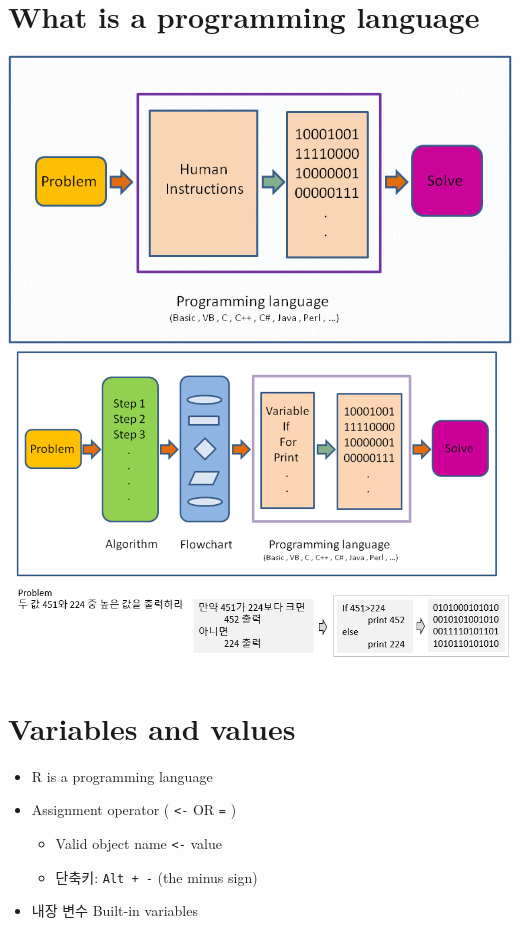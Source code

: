 \documentclass[
]{book}
\providecommand{\tightlist}{%
  \setlength{\itemsep}{0pt}\setlength{\parskip}{0pt}}
\begin{document}
\hypertarget{what-is-a-programming-language}{%
\section{What is a programming language}\label{what-is-a-programming-language}}

\includegraphics{images/01/24.PNG}
\includegraphics{images/01/25.PNG}

\hypertarget{variables-and-values}{%
\section{Variables and values}\label{variables-and-values}}

\begin{itemize}
\tightlist
\item
  R is a programming language
\item
  Assignment operator ( \texttt{\textless{}-} OR \texttt{=} )

  \begin{itemize}
  \tightlist
  \item
    Valid object name \texttt{\textless{}-} value
  \item
    단축키: \texttt{Alt\ +\ -} (the minus sign)
  \end{itemize}
\item
  내장 변수 Built-in variables
\end{itemize}
\end{document}
